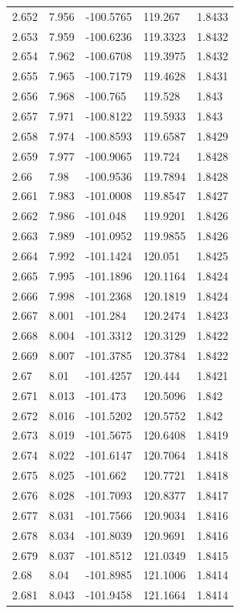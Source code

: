 \begin{tabular}{lllll}
2.652 & 7.956 & -100.5765 & 119.267 & 1.8433 \\
2.653 & 7.959 & -100.6236 & 119.3323 & 1.8432 \\
2.654 & 7.962 & -100.6708 & 119.3975 & 1.8432 \\
2.655 & 7.965 & -100.7179 & 119.4628 & 1.8431 \\
2.656 & 7.968 & -100.765 & 119.528 & 1.843 \\
2.657 & 7.971 & -100.8122 & 119.5933 & 1.843 \\
2.658 & 7.974 & -100.8593 & 119.6587 & 1.8429 \\
2.659 & 7.977 & -100.9065 & 119.724 & 1.8428 \\
2.66 & 7.98 & -100.9536 & 119.7894 & 1.8428 \\
2.661 & 7.983 & -101.0008 & 119.8547 & 1.8427 \\
2.662 & 7.986 & -101.048 & 119.9201 & 1.8426 \\
2.663 & 7.989 & -101.0952 & 119.9855 & 1.8426 \\
2.664 & 7.992 & -101.1424 & 120.051 & 1.8425 \\
2.665 & 7.995 & -101.1896 & 120.1164 & 1.8424 \\
2.666 & 7.998 & -101.2368 & 120.1819 & 1.8424 \\
2.667 & 8.001 & -101.284 & 120.2474 & 1.8423 \\
2.668 & 8.004 & -101.3312 & 120.3129 & 1.8422 \\
2.669 & 8.007 & -101.3785 & 120.3784 & 1.8422 \\
2.67 & 8.01 & -101.4257 & 120.444 & 1.8421 \\
2.671 & 8.013 & -101.473 & 120.5096 & 1.842 \\
2.672 & 8.016 & -101.5202 & 120.5752 & 1.842 \\
2.673 & 8.019 & -101.5675 & 120.6408 & 1.8419 \\
2.674 & 8.022 & -101.6147 & 120.7064 & 1.8418 \\
2.675 & 8.025 & -101.662 & 120.7721 & 1.8418 \\
2.676 & 8.028 & -101.7093 & 120.8377 & 1.8417 \\
2.677 & 8.031 & -101.7566 & 120.9034 & 1.8416 \\
2.678 & 8.034 & -101.8039 & 120.9691 & 1.8416 \\
2.679 & 8.037 & -101.8512 & 121.0349 & 1.8415 \\
2.68 & 8.04 & -101.8985 & 121.1006 & 1.8414 \\
2.681 & 8.043 & -101.9458 & 121.1664 & 1.8414 \\

\end{tabular}
